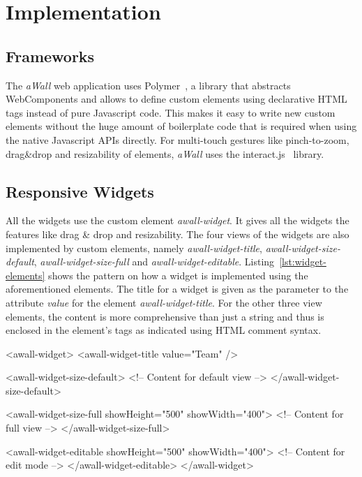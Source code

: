 \documentclass{sigchi}
\begin{document}
\section{Implementation}
\subsection{Frameworks}
The \textit{aWall} web application uses Polymer~\cite{polymer}, a library that abstracts WebComponents and allows to define custom elements using declarative HTML tags instead of pure Javascript code.
This makes it easy to write new custom elements without the huge amount of boilerplate code that is required when using the native Javascript APIs directly.
For multi-touch gestures like pinch-to-zoom, drag\&drop and resizability of elements, \textit{aWall} uses the interact.js~\cite{interactJs} library.

\subsection{Responsive Widgets}
All the widgets use the custom element \textit{awall-widget}.
It gives all the widgets the features like drag \& drop and resizability.
The four views of the widgets are also implemented by custom elements, namely \textit{awall-widget-title}, \textit{awall-widget-size-default}, \textit{awall-widget-size-full} and \textit{awall-widget-editable}.
Listing~\ref{lst:widget-elements} shows the pattern on how a widget is implemented using the aforementioned elements.
The title for a widget is given as the parameter to the attribute \textit{value} for the element \textit{awall-widget-title}.
For the other three view elements, the content is more comprehensive than just a string and thus is enclosed in the element's tags as indicated using HTML comment syntax.

\begin{code}[caption={HTML elements for the widget's different views.},label=lst:widget-elements]
<awall-widget>
  <awall-widget-title value="Team" />

  <awall-widget-size-default>
    <!-- Content for default view -->
  </awall-widget-size-default>

  <awall-widget-size-full showHeight="500" showWidth="400">
    <!-- Content for full view -->
  </awall-widget-size-full>

  <awall-widget-editable showHeight="500" showWidth="400">
    <!-- Content for edit mode -->
  </awall-widget-editable>
</awall-widget>
\end{code}
\end{document}
